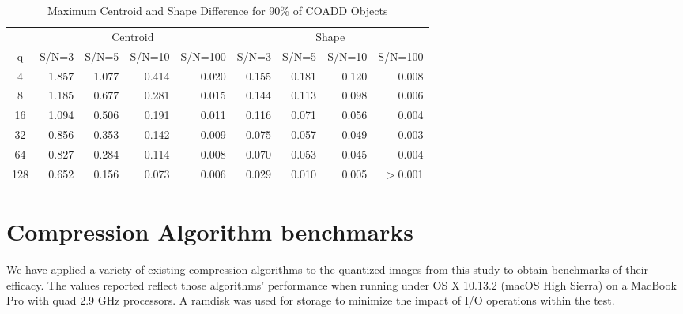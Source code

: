 \begin{table}
\caption{Maximum Centroid and Shape Difference for 90\% of COADD Objects}
\centering
\begin{tabular}[]{c|rrrr|rrrr}
\hline
     &  \multicolumn{4}{c}{Centroid}  & \multicolumn{4}{c}{Shape} \\
 q   &  S/N=3 & S/N=5 & S/N=10 & S/N=100 & S/N=3 & S/N=5 & S/N=10 & S/N=100  \\
\hline
   4 & 1.857 & 1.077 & 0.414 &  0.020   &  0.155 & 0.181 & 0.120 &  0.008 \\
   8 & 1.185 & 0.677 & 0.281 &  0.015   &  0.144 & 0.113 & 0.098 &  0.006 \\
  16 & 1.094 & 0.506 & 0.191 &  0.011   &  0.116 & 0.071 & 0.056 &  0.004 \\
  32 & 0.856 & 0.353 & 0.142 &  0.009   &  0.075 & 0.057 & 0.049 &  0.003 \\
  64 & 0.827 & 0.284 & 0.114 &  0.008   &  0.070 & 0.053 & 0.045 &  0.004 \\
 128 & 0.652 & 0.156 & 0.073 &  0.006   &  0.029 & 0.010 & 0.005 &  $>$0.001 \\
\hline
\end{tabular}
\label{tab_coadd_cen_shape_diff}
\end{table}



\clearpage

\section{Compression Algorithm benchmarks}

We have applied a variety of existing compression algorithms to the quantized images from this study to 
obtain benchmarks of their efficacy.  The values reported reflect those algorithms' performance when
running under OS X 10.13.2 (macOS High Sierra) on a MacBook Pro with quad 2.9 GHz processors.  A ramdisk
was used for storage to minimize the impact of I/O operations within the test.  

